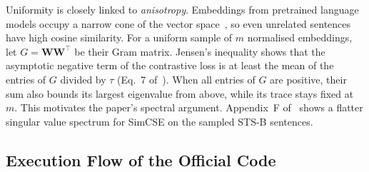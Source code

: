 Uniformity is closely linked to \emph{anisotropy}. Embeddings from pretrained
language models occupy a narrow cone of the vector
space~\cite{ethayarajh-2019-contextual}, so even unrelated sentences have high
cosine similarity. For a uniform sample of $m$ normalised embeddings,
let $G=\mathbf{W}\mathbf{W}^\top$ be their Gram matrix. Jensen's inequality
shows that the asymptotic negative term of the contrastive loss is at least
the mean of the entries of $G$ divided by $\tau$
(Eq.~7 of~\cite{gao-etal-2021-simcse}). When all entries of $G$ are
positive, their sum also bounds its largest eigenvalue from above, while
its trace stays fixed at $m$. This motivates the paper's spectral argument.
Appendix~F of~\cite{gao-etal-2021-simcse} shows a flatter singular value
spectrum for SimCSE on the sampled STS-B sentences.

\subsection{Execution Flow of the Official Code}
\label{sec:method-code}

